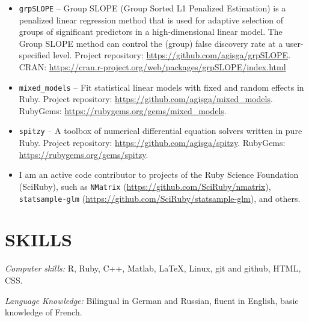 \documentclass[margin]{res} %
\begin{document}
\begin{resume}
\begin{itemize} \itemsep -2pt %
    \item \verb!grpSLOPE! -- Group SLOPE (Group Sorted L1 Penalized Estimation) is a penalized linear regression method that is used for adaptive selection of groups of significant predictors in a high-dimensional linear model. The Group SLOPE method can control the (group) false discovery rate at a user-specified level. Project repository: \url{https://github.com/agisga/grpSLOPE}. CRAN: \url{https://cran.r-project.org/web/packages/grpSLOPE/index.html} 
    \item \verb!mixed_models! -- Fit statistical linear models with fixed and random effects in Ruby. Project repository: \url{https://github.com/agisga/mixed_models}. RubyGems: \url{https://rubygems.org/gems/mixed_models}.
    \item \verb!spitzy! -- A toolbox of numerical differential equation solvers written in pure Ruby. Project repository: \url{https://github.com/agisga/spitzy}. RubyGems: \url{https://rubygems.org/gems/spitzy}.
    \item I am an active code contributor to projects of the Ruby Science Foundation (SciRuby), such as \verb!NMatrix! (\url{https://github.com/SciRuby/nmatrix}), \verb!statsample-glm! (\url{https://github.com/SciRuby/statsample-glm}), and others.
\end{itemize}
 

\section{SKILLS} 

{\sl Computer skills:}
R, Ruby, C++, Matlab, \LaTeX, Linux, git and github, HTML, CSS.

{\sl Language Knowledge:}
Bilingual in German and Russian, fluent in English, basic knowledge of French.

%
%


\end{resume}
\end{document}
